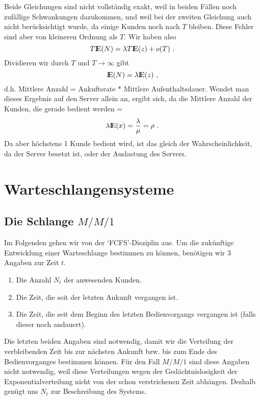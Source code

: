 Beide Gleichungen sind nicht vollständig exakt, weil in beiden Fällen
noch zufällige Schwankungen dazukommen, und weil bei der zweiten
Gleichung auch nicht berücksichtigt wurde, da\3 einige Kunden noch nach
$T$ bleiben. Diese Fehler sind aber von kleineren Ordnung als $T$. Wir
haben also
\begin{displaymath}
T {\rm I\kern-0.2em E} (N) = \lambda T {\rm I\kern-0.2em E} (z) + o(T) ~.
\end{displaymath}
Dividieren wir durch $T$ und $T \rightarrow \infty$ gibt
\begin{displaymath}
{\rm I\kern-0.2em E} (N) = \lambda  {\rm I\kern-0.2em E} (z) ~,
\end{displaymath}
d.h. Mittlere Anzahl = Ankuftsrate $*$ Mittlere Aufenthaltsdauer. Wendet
man dieses Ergebnis auf den Server allein an, ergibt sich, da\3 die
Mittlere Anzahl der Kunden, die gerade bedient werden =
\begin{displaymath}
\lambda  {\rm I\kern-0.2em E} (x) = \frac{\lambda}{\mu} = \rho ~.
\end{displaymath}
Da aber höchstens 1 Kunde bedient wird, ist das gleich der
Wahrscheinlichkeit, da\3 der Server besetzt ist, oder der Auslastung des
Servers.
\chapter{Warteschlangensysteme}
\section{Die Schlange $M/M/1$}
Im Folgenden gehen wir von der `FCFS'-Disziplin aus.
Um die zukünftige Entwicklung einer Warteschlange bestimmen zu können,
benötigen wir 3 Angaben zur Zeit $t$.
\begin{enumerate}
\item Die Anzahl $N_{t}$ der anwesenden Kunden.
\item Die Zeit, die seit der letzten Ankunft vergangen ist.
\item Die Zeit, die seit dem Beginn des letzten Bedienvorgangs vergangen
ist (falls dieser noch andauert).
\end{enumerate}
Die letzten beiden Angaben sind notwendig, damit wir die Verteilung der
verbleibenden Zeit bis zur nächsten Ankunft bzw. bis zum Ende des
Bedienvorganges bestimmen können. Für den Fall $M/M/1$ sind diese
Angaben nicht notwendig, weil diese Verteilungen wegen der
Gedächtnislosigkeit der Exponentialverteilung nicht von der schon
verstrichenen Zeit abhängen. Deshalb genügt uns $N_{t}$ zur Beschreibung
des Systems.

